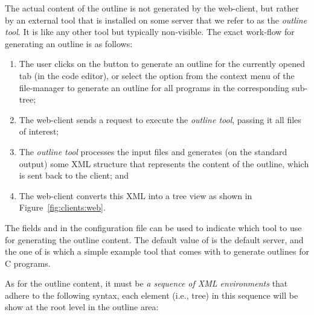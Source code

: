 The actual content of the outline is not generated by the web-client,
but rather by an external tool that is installed on some \ei server
that we refer to as the \emph{outline tool}. It is like any other tool
but typically non-visible.  The exact work-flow for generating an
outline is as follows:
%
\begin{enumerate}

\item The user clicks on the  button to generate an
  outline for the currently opened tab (in the code editor), or select
  the  option from the context menu of the file-manager
  to generate an outline for all programs in the corresponding
  sub-tree;

\item The web-client sends a request to execute the \emph{outline
    tool}, passing it all files of interest;

\item The \emph{outline tool} processes the input files and generates
  (on the standard output) some XML structure that represents the
  content of the outline, which is sent back to the client; and

\item The web-client converts this XML into a tree view as shown in
  Figure~\ref{fig:clients:web}.

\end{enumerate}
%
The fields  and  in the
configuration file can be used to indicate which tool to use for
generating the outline content. The default value of
 is the default server, and the one of
 is  which a simple example tool
that comes with \ei to generate outlines for C programs.

As for the outline content, it must be \emph{a sequence of XML
  environments} that adhere to the following syntax, each element
(i.e., tree) in this sequence will be show at the root level in the
outline area:

